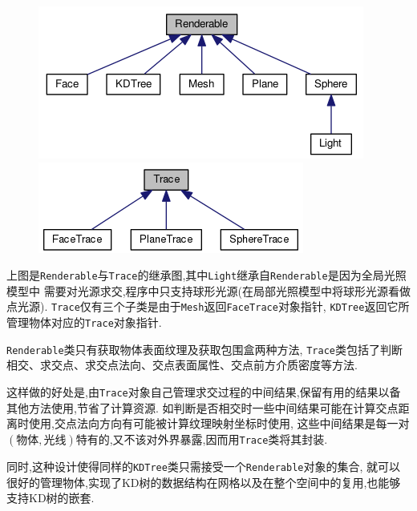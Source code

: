 \begin{figure}[H]
  \begin{minipage}[b]{0.46\linewidth}
    \centering
    \includegraphics[width=\textwidth]{res/renderable_inherit.png}
  \end{minipage}
  \begin{minipage}[b]{0.46\linewidth}
    \centering
    \includegraphics[width=\textwidth]{res/trace_inherit.png}
  \end{minipage}
\end{figure}

上图是\verb|Renderable|与\verb|Trace|的继承图,其中\verb|Light|继承自\verb|Renderable|是因为全局光照模型中
需要对光源求交,程序中只支持球形光源(在局部光照模型中将球形光源看做点光源).
\verb|Trace|仅有三个子类是由于\verb|Mesh|返回\verb|FaceTrace|对象指针, \verb|KDTree|返回它所管理物体对应的\verb|Trace|对象指针.

\verb|Renderable|类只有获取物体表面纹理及获取包围盒两种方法,
\verb|Trace|类包括了判断相交、求交点、求交点法向、交点表面属性、交点前方介质密度等方法.

这样做的好处是,由\verb|Trace|对象自己管理求交过程的中间结果,保留有用的结果以备其他方法使用,节省了计算资源.
如判断是否相交时一些中间结果可能在计算交点距离时使用,交点法向方向有可能被计算纹理映射坐标时使用,
这些中间结果是每一对$ (物体,光线)$特有的,又不该对外界暴露,因而用\verb|Trace|类将其封装.

同时,这种设计使得同样的\verb|KDTree|类只需接受一个\verb|Renderable|对象的集合,
就可以很好的管理物体,实现了KD树的数据结构在网格以及在整个空间中的复用,也能够支持KD树的嵌套.

